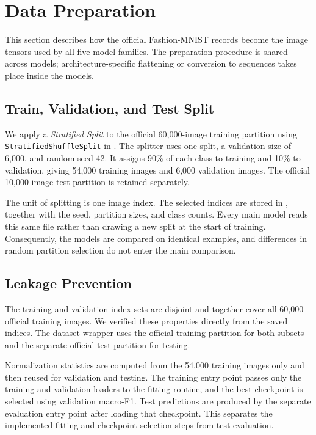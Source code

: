 \section{Data Preparation}
\label{sec:data-preparation}

This section describes how the official Fashion-MNIST records become the image tensors used by all five model families. The preparation procedure is shared across models; architecture-specific flattening or conversion to sequences takes place inside the models.

\subsection{Train, Validation, and Test Split}

We apply a \emph{Stratified Split} to the official 60,000-image training partition using \texttt{Stratified\-Shuffle\-Split} in . The splitter uses one split, a validation size of 6,000, and random seed 42. It assigns 90\% of each class to training and 10\% to validation, giving 54,000 training images and 6,000 validation images. The official 10,000-image test partition is retained separately.

The unit of splitting is one image index. The selected indices are stored in , together with the seed, partition sizes, and class counts. Every main model reads this same file rather than drawing a new split at the start of training. Consequently, the models are compared on identical examples, and differences in random partition selection do not enter the main comparison.

\subsection{Leakage Prevention}

The training and validation index sets are disjoint and together cover all 60,000 official training images. We verified these properties directly from the saved indices. The dataset wrapper uses the official training partition for both subsets and the separate official test partition for testing.

Normalization statistics are computed from the 54,000 training images only and then reused for validation and testing. The training entry point passes only the training and validation loaders to the fitting routine, and the best checkpoint is selected using validation macro-F1. Test predictions are produced by the separate evaluation entry point after loading that checkpoint. This separates the implemented fitting and checkpoint-selection steps from test evaluation.


